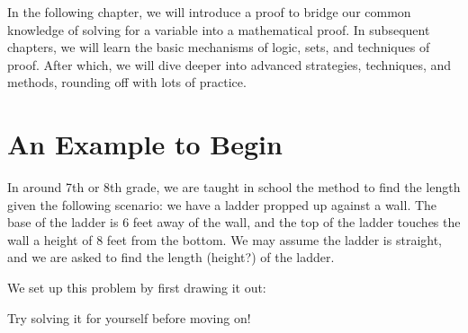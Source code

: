 In the following chapter, we will introduce a proof to bridge our common knowledge of solving for a variable into a mathematical proof. In subsequent chapters, we will learn the basic mechanisms of logic, sets, and techniques of proof. After which, we will dive deeper into advanced strategies, techniques, and methods, rounding off with lots of practice. 

\section{An Example to Begin}
In around 7th or 8th grade, we are taught in school the method to find the length given the following scenario: we have a ladder propped up against a wall. The base of the ladder is 6 feet away of the wall, and the top of the ladder touches the wall a height of 8 feet from the bottom. We may assume the ladder is straight, and we are asked to find the length (height?) of the ladder.

We set up this problem by first drawing it out:

\begin{center}
\end{center}

\begin{exercise}
    Try solving it for yourself before moving on!
\end{exercise}


